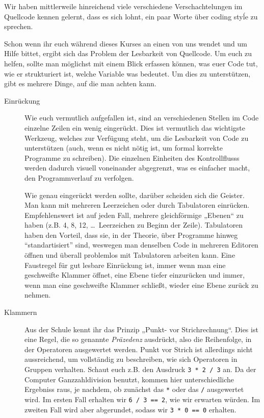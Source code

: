 \label{sec:codingstyle}
Wir haben mittlerweile hinreichend viele verschiedene Verschachtelungen im
Quellcode kennen gelernt, dass es sich lohnt, ein paar Worte über coding styĺe
zu sprechen.

Schon wenn ihr euch während dieses Kurses an einen von uns wendet und um Hilfe
bittet, ergibt sich das Problem der Lesbarkeit von Quellcode. Um euch zu
helfen, sollte man möglichst mit einem Blick erfassen können, was euer Code
tut, wie er strukturiert ist, welche Variable was bedeutet. Um dies zu
unterstützen, gibt es mehrere Dinge, auf die man achten kann.

\begin{description}
    \item[Einrückung]
          Wie euch vermutlich aufgefallen ist, sind an verschiedenen Stellen im
          Code einzelne Zeilen ein wenig eingerückt. Dies ist vermutlich das
          wichtigste Werkzeug, welches zur Verfügung steht, um die Lesbarkeit von
          Code zu unterstützen (auch, wenn es nicht nötig ist, um formal korrekte
          Programme zu schreiben). Die einzelnen Einheiten des Kontrollflusss
          werden dadurch visuell voneinander abgegrenzt, was es einfacher macht,
          den Programmverlauf zu verfolgen.

          Wie genau eingerückt werden sollte, darüber scheiden sich die Geister.
          Man kann mit mehreren Leerzeichen oder durch Tabulatoren einrücken.
          Empfehlenswert ist auf jeden Fall, mehrere gleichförmige „Ebenen“ zu
          haben (z.B. 4, 8, 12, \dots\ Leerzeichen zu Beginn der Zeile). Tabulatoren
          haben den Vorteil, dass sie, in der Theorie, über Programme hinweg “standartisiert” sind,
          weswegen man denselben Code in mehreren Editoren öffnen und
          überall problemlos mit Tabulatoren arbeiten kann. Eine
          Faustregel für gut lesbare Einrückung ist, immer wenn man eine
          geschweifte Klammer öffnet, eine Ebene tiefer einzurücken und immer,
          wenn man eine geschweifte Klammer schließt, wieder eine Ebene zurück zu
          nehmen.
    \item[Klammern]
          Aus der Schule kennt ihr das Prinzip „Punkt- vor Strichrechnung“. Dies
          ist eine Regel, die so genannte \emph{Präzedenz} ausdrückt, also die
          Reihenfolge, in der Operatoren ausgewertet werden. Punkt vor Strich ist
          allerdings nicht aussreichend, um vollständig zu beschreiben, wie sich
          Operatoren in Gruppen verhalten. Schaut euch z.B. den Ausdruck
          \texttt{3 * 2 / 3} an. Da der Computer Ganzzahldivision benutzt, kommen
          hier unterschiedliche Ergebniss raus, je nachdem, ob zunächst das
          \texttt{*} oder das \texttt{/} ausgewertet wird. Im ersten Fall
          erhalten wir \texttt{6 / 3 == 2}, wie wir erwarten würden. Im zweiten
          Fall wird aber abgerundet, sodass wir \texttt{3 * 0 == 0} erhalten.


\end{description}
